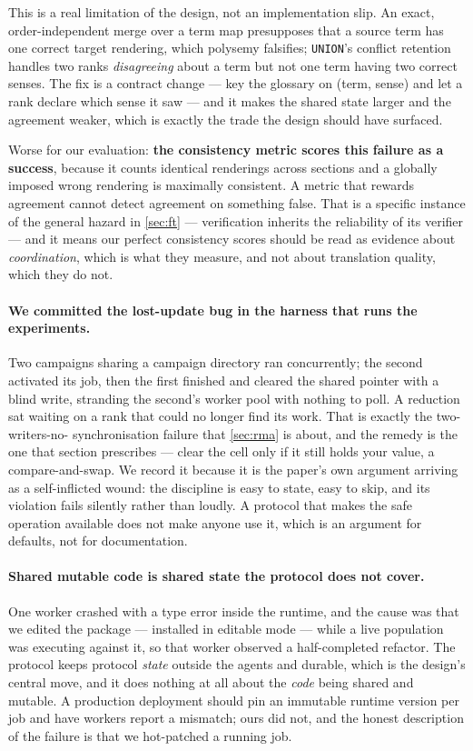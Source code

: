 \documentclass[10pt,twocolumn]{article}
\theoremstyle{definition}
\theoremstyle{plain}
\newcommand{\code}[1]{\texttt{\small #1}}
\begin{document}
This is a real limitation of the design, not an implementation slip. An exact,
order-independent merge over a term map presupposes that a source term has one
correct target rendering, which polysemy falsifies; \code{UNION}'s conflict retention
handles two ranks \emph{disagreeing} about a term but not one term having two correct
senses. The fix is a contract change --- key the glossary on (term, sense) and let a
rank declare which sense it saw --- and it makes the shared state larger and the
agreement weaker, which is exactly the trade the design should have surfaced.

Worse for our evaluation: \textbf{the consistency metric scores this failure as a
success}, because it counts identical renderings across sections and a globally
imposed wrong rendering is maximally consistent. A metric that rewards agreement
cannot detect agreement on something false. That is a specific instance of the general
hazard in \cref{sec:ft} --- verification inherits the reliability of its verifier ---
and it means our perfect consistency scores should be read as evidence about
\emph{coordination}, which is what they measure, and not about translation quality,
which they do not.

\paragraph{We committed the lost-update bug in the harness that runs the experiments.}
Two campaigns sharing a campaign directory ran concurrently; the second activated its
job, then the first finished and cleared the shared pointer with a blind write,
stranding the second's worker pool with nothing to poll. A reduction sat waiting on a
rank that could no longer find its work. That is exactly the two-writers-no-
synchronisation failure that \cref{sec:rma} is about, and the remedy is the one that
section prescribes --- clear the cell only if it still holds your value, a
compare-and-swap. We record it because it is the paper's own argument arriving as a
self-inflicted wound: the discipline is easy to state, easy to skip, and its violation
fails silently rather than loudly. A protocol that makes the safe operation available
does not make anyone use it, which is an argument for defaults, not for documentation.

\paragraph{Shared mutable code is shared state the protocol does not cover.} One
worker crashed with a type error inside the runtime, and the cause was that we edited
the package --- installed in editable mode --- while a live population was executing
against it, so that worker observed a half-completed refactor. The protocol keeps
protocol \emph{state} outside the agents and durable, which is the design's central
move, and it does nothing at all about the \emph{code} being shared and mutable. A
production deployment should pin an immutable runtime version per job and have workers
report a mismatch; ours did not, and the honest description of the failure is that we
hot-patched a running job.
\end{document}
